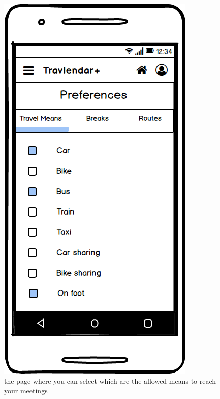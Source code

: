 \documentclass[11pt]{article}
\begin{document}
		\begin{figure}
		\centering
		\includegraphics[width=0.7\linewidth]{PreferencesTravelMeans.png}
		\caption{the page where you can select which are the allowed means to reach your meetings}
		\label{fig:preferencestravelmeans}
	\end{figure}
	
\end{document}
